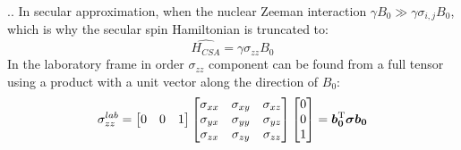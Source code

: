 \documentclass{beamer}
\begin{document}
\begin{frame}{\thesection.\thesubsection. \insertsubsection}
    In secular approximation, when the nuclear Zeeman interaction $\gamma B_0 \gg \gamma \sigma_{i,j} B_0$, which is why the secular spin Hamiltonian is truncated to:
    \begin{equation}
       \hat{H_{CSA}} = \gamma \sigma_{zz} B_0
    \end{equation}
    In the laboratory frame in order  $\sigma_{zz}$ component can be found from a full tensor using a product with a unit vector along the direction of $B_0$:
    \begin{equation} \label{eq:sigma_zz}
       \sigma_{zz}^{lab}= 
       \begin{bmatrix}
          0 & 0 & 1
       \end{bmatrix}       
      \begin{bmatrix}
      \sigma_{xx} & \sigma_{xy} & \sigma_{xz} \\
      \sigma_{yx} & \sigma_{yy} & \sigma_{yz} \\
      \sigma_{zx} & \sigma_{zy} & \sigma_{zz} \\
      \end{bmatrix}       
      \begin{bmatrix}
      0 \\
      0 \\
      1 \\
      \end{bmatrix} = \bm{b_0}^{\rm T} \bm{\sigma} \bm{b_0}
    \end{equation}
\end{frame}
\end{document}
